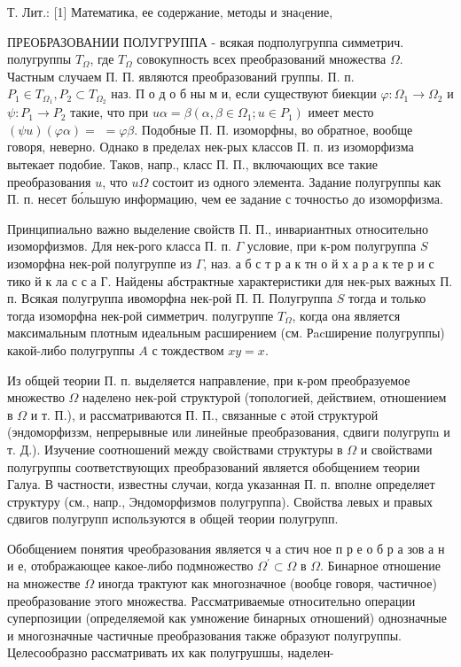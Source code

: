 \documentclass[10pt]{article}
\begin{document}
Т. Лит.: [1] Математика, ее содержание, методы и знаqение,



ПРЕОБРАЗОВАНИИ ПОЛУГРУППА - всякая подполугруппа симметрич. полугруппы $T_{\Omega}$, где $T_{\Omega}$ совокупность всех преобразований множества $\Omega$. Частным случаем П. П. являются преобразований группы. П. п. $P_{1} \in T_{\Omega_{1}}, P_{2} \subset T_{\Omega_{2}}$ наз. П о д о б ны м и, если существуют биекции $\varphi: \Omega_{1} \rightarrow \Omega_{2}$ и $\psi: P_{1} \rightarrow P_{2}$ такие, что при $u \alpha=\beta\left(\alpha, \beta \in \Omega_{1} ; u \in P_{1}\right)$ имеет место $(\psi u)(\varphi \alpha)=$ $=\varphi \beta$. Подобные П. П. изоморфны, во обратное, вообще говоря, неверно. Однако в пределах нек-рых классов П. п. из изоморфизма вытекает подобие. Таков, напр., класс П. П., включающих все такие преобразования $u$, что $u \Omega$ состоит из одного элемента. Задание полугруппы как П. п. несет бо́льшую информацию, чем ее задание с точностьо до изоморфизма.



Принципиально важно выделение свойств П. П., инвариантных относительно изоморфизмов. Для нек-рого класса П. п. $\Gamma$ условие, при к-ром полугруппа $S$ изоморфна нек-рой полугруппе из $\Gamma$, наз. а б с т р а к тн о й х а р а к те р и с тико й к ла с с а $Г$. Найдены абстрактные характеристики для нек-рых важных П. п. Всякая полугруппа ивоморфна нек-рой П. П. Полугруппа $S$ тогда и только тогда изоморфна нек-рой симметрич. полугруппе $T_{\Omega}$, когда она является максимальным плотным идеальным расширением (см. Рacширение полугруппы) какой-либо полугруппы $A$ с тождеством $x y=x$.



Из общей теории П. п. выделяется направление, при к-ром преобразуемое множество $\Omega$ наделено нек-рой структурой (топологией, действием, отношением в $\Omega$ и т. П.), и рассматриваются П. П., связанные с әтой структурой (эндоморфиззм, непрерывные или линейные преобразования, сдвиги полугрупn и т. Д.). Изучение соотношений между свойствами структуры в $\Omega$ и свойствами полугруппы соответствующих преобразований является обобщением теории Галуа. В частности, известны случаи, когда указанная П. п. вполне определяет структуру (см., напр., Эндоморфизмов полугруппа). Свойства левых и правых сдвигов полугрупп используются в общей теории полугрупп.



Обобщением понятия чреобразования является ч а стич ное п р е о б р а зов а н и е, отображающее какое-либо подмножество $\Omega^{\prime} \subset \Omega$ в $\Omega$. Бинарное отношение на множестве $\Omega$ иногда трактуют как многозначное (вообце говоря, частичное) преобразование этого множества. Рассматриваемые относительно операции суперпозиции (определяемой как умножение бинарных отношений) однозначные и многозначные частичные преобразования также образуют полугруппы. Целесообразно рассматривать их как полугрушшы, наделен-
\end{document}
